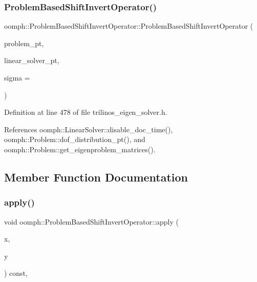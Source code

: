 \subsubsection{\texorpdfstring{Problem\+Based\+Shift\+Invert\+Operator()}{ProblemBasedShiftInvertOperator()}}
{\footnotesize\ttfamily oomph\+::\+Problem\+Based\+Shift\+Invert\+Operator\+::\+Problem\+Based\+Shift\+Invert\+Operator (\begin{DoxyParamCaption}\item[{\hyperlink{classoomph_1_1Problem}{Problem} $\ast$const \&}]{problem\+\_\+pt,  }\item[{\hyperlink{classoomph_1_1LinearSolver}{Linear\+Solver} $\ast$const \&}]{linear\+\_\+solver\+\_\+pt,  }\item[{const double \&}]{sigma = {} }\end{DoxyParamCaption})\hspace{0.3cm}{\ttfamily [inline]}}



Definition at line 478 of file trilinos\+\_\+eigen\+\_\+solver.\+h.



References oomph\+::\+Linear\+Solver\+::disable\+\_\+doc\+\_\+time(), oomph\+::\+Problem\+::dof\+\_\+distribution\+\_\+pt(), and oomph\+::\+Problem\+::get\+\_\+eigenproblem\+\_\+matrices().



\subsection{Member Function Documentation}
\mbox{\label{classoomph_1_1ProblemBasedShiftInvertOperator_a1f209382d6023466da7e978ce16f1c09}} 
\subsubsection{\texorpdfstring{apply()}{apply()}}
{\footnotesize\ttfamily void oomph\+::\+Problem\+Based\+Shift\+Invert\+Operator\+::apply (\begin{DoxyParamCaption}\item[{const \hyperlink{classoomph_1_1DoubleMultiVector}{Double\+Multi\+Vector} \&}]{x,  }\item[{\hyperlink{classoomph_1_1DoubleMultiVector}{Double\+Multi\+Vector} \&}]{y }\end{DoxyParamCaption}) const\hspace{0.3cm}{\ttfamily [inline]}, {\ttfamily [virtual]}}



